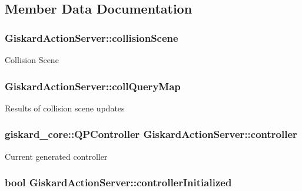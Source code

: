 \subsection{Member Data Documentation}
\hypertarget{classGiskardActionServer_a9092b32b81ae2e3c13ab6f5632e716a1}{
\subsubsection[{collision\-Scene}]{ Giskard\-Action\-Server\-::collision\-Scene\hspace{0.3cm}{\ttfamily [private]}}}\label{classGiskardActionServer_a9092b32b81ae2e3c13ab6f5632e716a1}
Collision Scene \hypertarget{classGiskardActionServer_a6dc2df6171c07b6c15e20e91533b0430}{
\subsubsection[{coll\-Query\-Map}]{ Giskard\-Action\-Server\-::coll\-Query\-Map\hspace{0.3cm}{\ttfamily [private]}}}\label{classGiskardActionServer_a6dc2df6171c07b6c15e20e91533b0430}
Results of collision scene updates \hypertarget{classGiskardActionServer_a72419de3a5237d2ee09ad92f1ed81da1}{
\subsubsection[{controller}]{\setlength{\rightskip}{0pt plus 5cm}giskard\-\_\-core\-::\-Q\-P\-Controller Giskard\-Action\-Server\-::controller\hspace{0.3cm}{\ttfamily [protected]}}}\label{classGiskardActionServer_a72419de3a5237d2ee09ad92f1ed81da1}
Current generated controller \hypertarget{classGiskardActionServer_a46b468b15e97c46911fccfccf960ea76}{
\subsubsection[{controller\-Initialized}]{\setlength{\rightskip}{0pt plus 5cm}bool Giskard\-Action\-Server\-::controller\-Initialized\hspace{0.3cm}{\ttfamily [private]}}}\label{classGiskardActionServer_a46b468b15e97c46911fccfccf960ea76}
